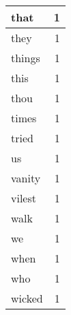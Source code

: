 \begin{center}
\begin{longtable}{l|r}
that & 1 \\ \hline
they & 1 \\ \hline
things & 1 \\ \hline
this & 1 \\ \hline
thou & 1 \\ \hline
times & 1 \\ \hline
tried & 1 \\ \hline
us & 1 \\ \hline
vanity & 1 \\ \hline
vilest & 1 \\ \hline
walk & 1 \\ \hline
we & 1 \\ \hline
when & 1 \\ \hline
who & 1 \\ \hline
wicked & 1 \\ \hline
\end{longtable}
\end{center}

\normalsize